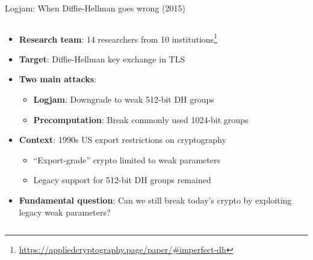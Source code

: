 \documentclass[aspectratio=169, lualatex, handout]{beamer}
\begin{document}
\begin{frame}{Logjam: When Diffie-Hellman goes wrong (2015)}
	\begin{columns}[c]
		\begin{column}{1\textwidth}
			\begin{itemize}[<+->]
				\item \textbf{Research team}: 14 researchers from 10 institutions\footnote{\url{https://appliedcryptography.page/paper/\#imperfect-dh}}
				\item \textbf{Target}: Diffie-Hellman key exchange in TLS
				\item \textbf{Two main attacks}:
				      \begin{itemize}
					      \item \textbf{Logjam}: Downgrade to weak 512-bit DH groups
					      \item \textbf{Precomputation}: Break commonly used 1024-bit groups
				      \end{itemize}
				\item \textbf{Context}: 1990s US export restrictions on cryptography
				      \begin{itemize}
					      \item ``Export-grade'' crypto limited to weak parameters
					      \item Legacy support for 512-bit DH groups remained
				      \end{itemize}
				\item \textbf{Fundamental question}: Can we still break today's crypto by exploiting legacy weak parameters?
			\end{itemize}
		\end{column}
	\end{columns}
\end{frame}
\end{document}
